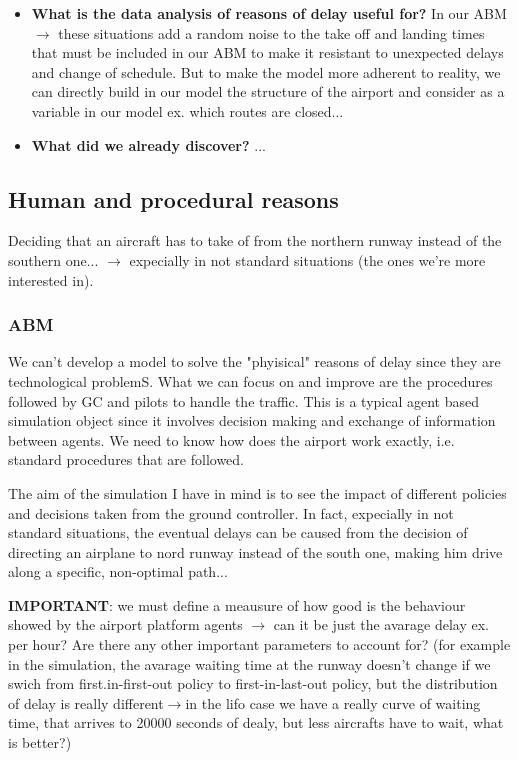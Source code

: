 \documentclass{article}
\begin{document}
\begin{itemize}
\item \textbf{What is the data analysis of reasons of delay useful for?} In our ABM $\rightarrow$ these situations add a random noise to the take off and landing times that must be included in our ABM to make it resistant to unexpected delays and change of schedule. But to make the model more adherent to reality, we can directly build in our model the structure of the airport and consider as a variable in our model ex. which routes are closed...

\item \textbf{What did we already discover?} ...
\end{itemize}

\subsection*{Human and procedural reasons}
Deciding that an aircraft has to take of from the northern runway instead of the southern one... $ \rightarrow $ expecially in not standard situations (the ones we're more interested in).
\subsubsection*{ABM}
We can't develop a model to solve the "phyisical" reasons of delay since they are technological problemS. What we can focus on and improve are the procedures followed by GC and pilots to handle the traffic. This is a typical agent based simulation object since it involves decision making and exchange of information between agents. We need to know how does the airport work exactly, i.e. standard procedures that are followed. 

The aim of the simulation I have in mind is to see the impact of different policies and decisions taken from the ground controller. In fact, expecially in not standard situations, the eventual delays can be caused from the decision of directing an airplane to nord runway instead of the south one, making him drive along a specific, non-optimal path...


\textbf{IMPORTANT}: we must define a meausure of how good is the behaviour showed by the airport platform agents $ \rightarrow $ can it be just the avarage delay ex. per hour? Are there any other important parameters to account for? (for example in the simulation, the avarage waiting time at the runway doesn't change if we swich from first.in-first-out policy to first-in-last-out policy, but the distribution of delay is really different$ \rightarrow $in the lifo case we have a really curve of waiting time, that arrives to 20000 seconds of dealy, but less aircrafts have to wait, what is better?)
\end{document}
